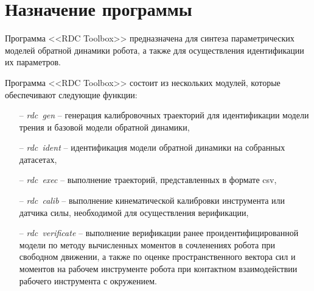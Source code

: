 \newpage
\section{Назначение программы}


Программа <<RDC Toolbox>> предназначена для синтеза параметрических моделей обратной динамики робота, а также для осуществления идентификации их параметров.

Программа <<RDC Toolbox>> состоит из нескольких модулей, которые обеспечивают следующие функции:
\begin{enumerate}
    \item[--] \textit{rdc~gen} -- генерация калибровочных траекторий для идентификации модели трения и базовой модели обратной динамики,
    \item[--] \textit{rdc~ident} -- идентификация модели обратной динамики на собранных датасетах,
    \item[--] \textit{rdc~exec} -- выполнение траекторий, представленных в формате csv,
    \item[--] \textit{rdc~calib} -- выполнение кинематической калибровки инструмента или датчика силы, необходимой для осуществления верификации,
    \item[--] \textit{rdc~verificate} -- выполнение верификации ранее проидентифицированной модели по методу вычисленных моментов в сочленениях робота при свободном движении, а также по оценке пространственного вектора сил и моментов на рабочем инструменте робота при контактном взаимодействии рабочего инструмента с окружением.
\end{enumerate}
